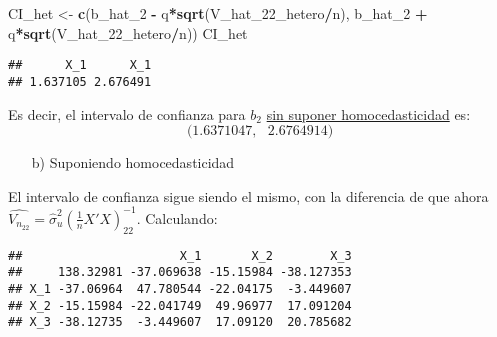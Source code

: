 \documentclass[
]{article}
\newenvironment{Shaded}{\begin{snugshade}}{\end{snugshade}}
\newcommand{\DecValTok}[1]{\textcolor[rgb]{0.00,0.00,0.81}{#1}}
\newcommand{\FunctionTok}[1]{\textcolor[rgb]{0.13,0.29,0.53}{\textbf{#1}}}
\newcommand{\NormalTok}[1]{#1}
\newcommand{\OtherTok}[1]{\textcolor[rgb]{0.56,0.35,0.01}{#1}}
\newcommand{\SpecialCharTok}[1]{\textcolor[rgb]{0.81,0.36,0.00}{\textbf{#1}}}
\begin{document}
\begin{Shaded}
\begin{Highlighting}[]
\NormalTok{CI\_het }\OtherTok{\textless{}{-}} \FunctionTok{c}\NormalTok{(b\_hat\_2 }\SpecialCharTok{{-}}\NormalTok{ q}\SpecialCharTok{*}\FunctionTok{sqrt}\NormalTok{(V\_hat\_22\_hetero}\SpecialCharTok{/}\NormalTok{n),}
\NormalTok{        b\_hat\_2 }\SpecialCharTok{+}\NormalTok{ q}\SpecialCharTok{*}\FunctionTok{sqrt}\NormalTok{(V\_hat\_22\_hetero}\SpecialCharTok{/}\NormalTok{n))}
\NormalTok{CI\_het}
\end{Highlighting}
\end{Shaded}

\begin{verbatim}
##      X_1      X_1 
## 1.637105 2.676491
\end{verbatim}

Es decir, el intervalo de confianza para \(b_2\)
\underline{sin suponer homocedasticidad} es: \[
\Big(1.6371047 , \ \ \ 2.6764914\Big)
\]

\begin{itemize}
  \item[b)] Suponiendo homocedasticidad
\end{itemize}

El intervalo de confianza sigue siendo el mismo, con la diferencia de
que ahora
\(\hat{V_{n_{22}}} = \hat{\sigma}_u^2(\frac{1}{n}X'X)^{-1}_{22}\).
Calculando:

\begin{Shaded}
\end{Shaded}

\begin{verbatim}
##                      X_1       X_2        X_3
##     138.32981 -37.069638 -15.15984 -38.127353
## X_1 -37.06964  47.780544 -22.04175  -3.449607
## X_2 -15.15984 -22.041749  49.96977  17.091204
## X_3 -38.12735  -3.449607  17.09120  20.785682
\end{verbatim}
\end{document}
